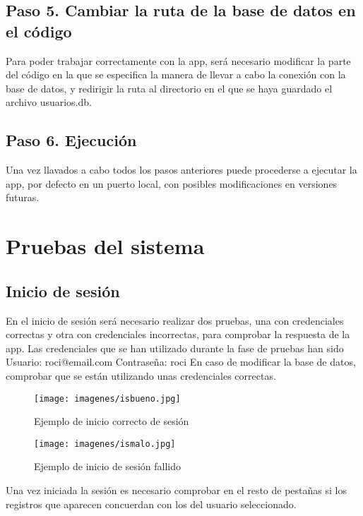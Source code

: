 \documentclass[a4paper,12pt,twoside]{memoir}
\begin{document}
\subsection{Paso 5. Cambiar la ruta de la base de datos en el código}
Para poder trabajar correctamente con la app, será necesario modificar la parte del código en la que se especifica la manera de llevar a cabo la conexión con la base de datos, y redirigir la ruta al directorio en el que se haya guardado el archivo usuarios.db.

\subsection{Paso 6. Ejecución}
Una vez llavados a cabo todos los pasos anteriores puede procederse a ejecutar la app, por defecto en un puerto local, con posibles modificaciones en versiones futuras.

\section{Pruebas del sistema}
\subsection{Inicio de sesión}
En el inicio de sesión será necesario realizar dos pruebas, una con credenciales correctas y otra con credenciales incorrectas, para comprobar la respuesta de la app. Las credenciales que se han utilizado durante la fase de pruebas han sido 
Usuario: roci@email.com
Contraseña: roci
En caso de modificar la base de datos, comprobar que se están utilizando unas credenciales correctas.
 \begin{figure}
    \centering
    \texttt{[image: imagenes/isbueno.jpg]}
    \caption{Ejemplo de inicio correcto de sesión}
    \label{fig:enter-label}
\end{figure}
 \begin{figure}
    \centering
    \texttt{[image: imagenes/ismalo.jpg]}
    \caption{Ejemplo de inicio de sesión fallido}
    \label{fig:enter-label}
\end{figure}
Una vez iniciada la sesión es necesario comprobar en el resto de pestañas si los registros que aparecen concuerdan con los del usuario seleccionado.
\end{document}
